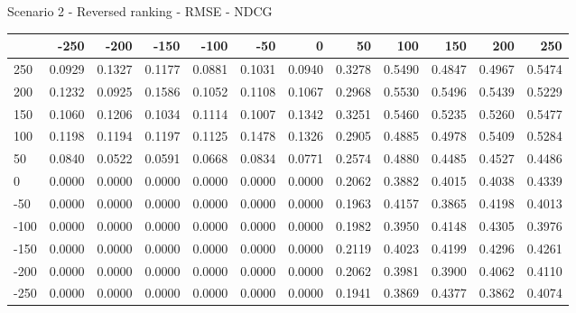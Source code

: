 Scenario 2 - Reversed ranking - RMSE - NDCG
\begin{tabular}{lrrrrrrrrrrr}
\toprule
{} &   -250 &   -200 &   -150 &   -100 &   -50  &    0   &    50  &    100 &    150 &    200 &    250 \\
\midrule
 250 & 0.0929 & 0.1327 & 0.1177 & 0.0881 & 0.1031 & 0.0940 & 0.3278 & 0.5490 & 0.4847 & 0.4967 & 0.5474 \\
 200 & 0.1232 & 0.0925 & 0.1586 & 0.1052 & 0.1108 & 0.1067 & 0.2968 & 0.5530 & 0.5496 & 0.5439 & 0.5229 \\
 150 & 0.1060 & 0.1206 & 0.1034 & 0.1114 & 0.1007 & 0.1342 & 0.3251 & 0.5460 & 0.5235 & 0.5260 & 0.5477 \\
 100 & 0.1198 & 0.1194 & 0.1197 & 0.1125 & 0.1478 & 0.1326 & 0.2905 & 0.4885 & 0.4978 & 0.5409 & 0.5284 \\
 50  & 0.0840 & 0.0522 & 0.0591 & 0.0668 & 0.0834 & 0.0771 & 0.2574 & 0.4880 & 0.4485 & 0.4527 & 0.4486 \\
 0   & 0.0000 & 0.0000 & 0.0000 & 0.0000 & 0.0000 & 0.0000 & 0.2062 & 0.3882 & 0.4015 & 0.4038 & 0.4339 \\
-50  & 0.0000 & 0.0000 & 0.0000 & 0.0000 & 0.0000 & 0.0000 & 0.1963 & 0.4157 & 0.3865 & 0.4198 & 0.4013 \\
-100 & 0.0000 & 0.0000 & 0.0000 & 0.0000 & 0.0000 & 0.0000 & 0.1982 & 0.3950 & 0.4148 & 0.4305 & 0.3976 \\
-150 & 0.0000 & 0.0000 & 0.0000 & 0.0000 & 0.0000 & 0.0000 & 0.2119 & 0.4023 & 0.4199 & 0.4296 & 0.4261 \\
-200 & 0.0000 & 0.0000 & 0.0000 & 0.0000 & 0.0000 & 0.0000 & 0.2062 & 0.3981 & 0.3900 & 0.4062 & 0.4110 \\
-250 & 0.0000 & 0.0000 & 0.0000 & 0.0000 & 0.0000 & 0.0000 & 0.1941 & 0.3869 & 0.4377 & 0.3862 & 0.4074 \\
\bottomrule
\end{tabular}

